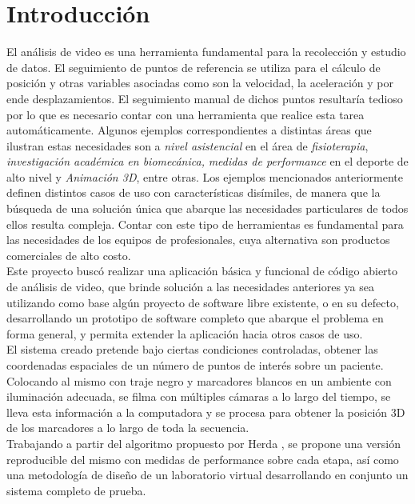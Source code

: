 \section{Introducción}
El análisis de video  es  una  herramienta  fundamental para la recolección y estudio de datos. El seguimiento de puntos de referencia se utiliza para el cálculo de posición y otras variables asociadas como son la velocidad, la aceleración y por ende desplazamientos. 
El seguimiento manual de dichos puntos resultaría tedioso por lo que es necesario contar con una herramienta que realice esta tarea automáticamente.
Algunos ejemplos correspondientes a distintas áreas que ilustran estas necesidades son a \emph{nivel asistencial} en el área de \emph{fisioterapia}, \emph{investigación académica en biomecánica,} \emph{medidas de performance} en el deporte de alto nivel y \emph{Animación 3D}, entre otras. 
Los ejemplos mencionados anteriormente definen distintos casos de uso con características disímiles, de manera que la búsqueda de una solución única que abarque las necesidades particulares de todos ellos resulta compleja. Contar con este tipo de herramientas es fundamental para las necesidades de los equipos de profesionales, cuya alternativa son productos comerciales de alto costo.\\
\hspace*{0.5cm}Este proyecto buscó realizar una aplicación básica y funcional de código abierto de análisis de video, que brinde solución a las necesidades anteriores ya sea utilizando como base algún  proyecto  de  software  libre  existente, o en su defecto, desarrollando un prototipo de software completo que abarque el problema en forma general, y permita extender la aplicación hacia otros casos de uso.\\
\hspace*{0.5cm}El sistema creado pretende bajo ciertas condiciones controladas, obtener las coordenadas espaciales de un número de puntos de interés sobre un paciente. 
Colocando al mismo con traje negro y marcadores blancos en un ambiente con iluminación adecuada, se filma con múltiples cámaras a lo largo del tiempo, se lleva esta información a la computadora y se procesa para obtener la posición 3D de los marcadores a lo largo de toda la secuencia.\\
\hspace*{0.5cm}Trabajando a partir del algoritmo propuesto por Herda \cite{herda}, se propone una versión reproducible del mismo con medidas de performance sobre cada etapa, así como una metodología de diseño de un laboratorio virtual desarrollando en conjunto  un sistema completo de prueba.
